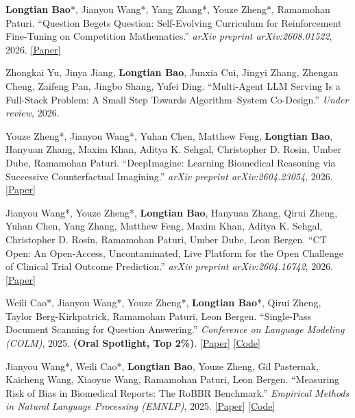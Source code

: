 \documentclass[11pt]{article}
\begin{document}
\begin{enumerate}[label={[\arabic*]}, leftmargin=2.2em, itemsep=2pt, topsep=2pt]
    \item \textbf{Longtian Bao}*, Jianyou Wang*, Yang Zhang*, Youze Zheng*, Ramamohan Paturi.
    ``Question Begets Question: Self-Evolving Curriculum for Reinforcement Fine-Tuning on Competition Mathematics.''
    \textit{arXiv preprint arXiv:2608.01522}, 2026.
    \href{https://arxiv.org/abs/2608.01522}{[Paper]}

    \item Zhongkai Yu, Jinya Jiang, \textbf{Longtian Bao}, Junxia Cui, Jingyi Zhang, Zhengan Cheng, Zaifeng Pan, Jingbo Shang, Yufei Ding.
    ``Multi-Agent LLM Serving Is a Full-Stack Problem: A Small Step Towards Algorithm--System Co-Design.''
    \textit{Under review}, 2026.

    \item Youze Zheng*, Jianyou Wang*, Yuhan Chen, Matthew Feng, \textbf{Longtian Bao}, Hanyuan Zhang, Maxim Khan, Aditya K. Sehgal, Christopher D. Rosin, Umber Dube, Ramamohan Paturi.
    ``DeepImagine: Learning Biomedical Reasoning via Successive Counterfactual Imagining.''
    \textit{arXiv preprint arXiv:2604.23054}, 2026.
    \href{https://arxiv.org/abs/2604.23054}{[Paper]}

    \item Jianyou Wang*, Youze Zheng*, \textbf{Longtian Bao}, Hanyuan Zhang, Qirui Zheng, Yuhan Chen, Yang Zhang, Matthew Feng, Maxim Khan, Aditya K. Sehgal, Christopher D. Rosin, Ramamohan Paturi, Umber Dube, Leon Bergen.
    ``CT Open: An Open-Access, Uncontaminated, Live Platform for the Open Challenge of Clinical Trial Outcome Prediction.''
    \textit{arXiv preprint arXiv:2604.16742}, 2026.
    \href{https://arxiv.org/abs/2604.16742}{[Paper]}

    \item Weili Cao*, Jianyou Wang*, Youze Zheng*, \textbf{Longtian Bao}*, Qirui Zheng, Taylor Berg-Kirkpatrick, Ramamohan Paturi, Leon Bergen.
    ``Single-Pass Document Scanning for Question Answering.''
    \textit{Conference on Language Modeling (COLM)}, 2025. \textbf{(Oral Spotlight, Top 2\%)}.
    \href{https://arxiv.org/abs/2504.03101}{[Paper]}
    \href{https://github.com/weilicao/SPScanner}{[Code]}

    \item Jianyou Wang*, Weili Cao*, \textbf{Longtian Bao}, Youze Zheng, Gil Pasternak, Kaicheng Wang, Xiaoyue Wang, Ramamohan Paturi, Leon Bergen.
    ``Measuring Risk of Bias in Biomedical Reports: The RoBBR Benchmark.''
    \textit{Empirical Methods in Natural Language Processing (EMNLP)}, 2025.
    \href{https://arxiv.org/abs/2411.18831}{[Paper]}
    \href{https://github.com/RoBBR-Benchmark/RoBBR}{[Code]}
\end{enumerate}
\end{document}
